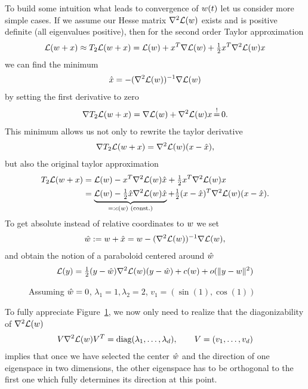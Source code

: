 To build some intuition what leads to convergence of \(w(t)\) let us
consider more simple cases. If we assume our Hesse matrix \(\nabla^2
\mathcal{L}(w)\) exists and is positive definite (all eigenvalues positive), then for
the second order Taylor approximation
%
\begin{align*}
	\mathcal{L}(w+x) \approx T_2\mathcal{L}(w+x)
	= \mathcal{L}(w) + x^T \nabla \mathcal{L}(w) + \tfrac12 x^T \nabla^2 \mathcal{L}(w) x
\end{align*}
%
we can find the minimum 
\begin{align*}
	\hat{x} = -(\nabla^2 \mathcal{L}(w))^{-1}\nabla \mathcal{L}(w)
\end{align*}
by setting the first derivative to zero
%
\begin{align*}
	\nabla T_2\Loss(\weights+x) = \nabla \Loss(\weights) + \nabla^2\Loss(\weights) x \xeq{!} 0.
\end{align*}
%
This minimum allows us not only to rewrite the taylor derivative
%
\begin{align*}
	\nabla T_2\mathcal{L}(w+x) = \nabla^2 \mathcal{L}(w)(x-\hat{x}),
\end{align*}
%
but also the original taylor approximation
%
\begin{align*}
	T_2\mathcal{L}(w+x)
	&= \mathcal{L}(w) - x^T \nabla^2 \mathcal{L}(w) \hat{x} + \tfrac12 x^T \nabla^2 \mathcal{L}(w) x \\
	&= \underbrace{
		\mathcal{L}(w) - \tfrac12 \hat{x} \nabla^2 \mathcal{L}(w) \hat{x}
	}_{
		=: c(w) \text{ (const.)}
	} + \tfrac12 (x-\hat{x})^T \nabla^2 \mathcal{L}(w)(x-\hat{x}).
\end{align*}
%
To get absolute instead of relative coordinates to \(w\) we set
%
\begin{align}\label{eq: newton minimum approx}
	\hat{w} := w + \hat{x} = w -(\nabla^2 \mathcal{L}(w))^{-1}\nabla \mathcal{L}(w),
\end{align}
%
and obtain the notion of a paraboloid centered around \(\hat{w}\)
%
\begin{align}\label{paraboloid approximation of L}
	\mathcal{L}(y)
	= \tfrac12 (y- \hat{w}) \nabla^2 \mathcal{L}(w) (y-\hat{w})
	+ c(w) + o(\|y-w\|^2)
\end{align}
%
\begin{wrapfigure}{O}{0.65\textwidth}
	\centering
	\def\svgwidth{0.65\textwidth}
	
	\caption{Assuming \(\hat{w}=0\), \(\lambda_1=1, \lambda_2=2\), \(v_1=(\sin(1), \cos(1))\)}
	\label{fig: 2d paraboloid}
\end{wrapfigure}
%
To fully appreciate Figure~\ref{fig: 2d paraboloid}, we now only need to realize
that the diagonizability of \(\nabla^2 \mathcal{L}(w)\)
%
\begin{align}\label{eq: diagnalization of the Hesse matrix}
	V \nabla^2 \mathcal{L}(w) V^T
	= \text{diag}(\lambda_1,\dots,\lambda_d), \qquad V=(v_1,\dots, v_d)
\end{align}
%
implies that once we have selected the center \(\hat{w}\) and the direction of
one eigenspace in two dimensions, the other eigenspace has to be
orthogonal to the first one which fully determines its direction at this point. 

